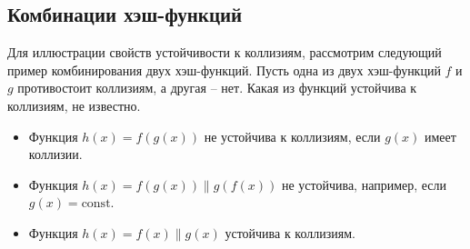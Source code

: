 \subsection{Комбинации хэш-функций}

Для иллюстрации свойств устойчивости к коллизиям, рассмотрим следующий пример комбинирования двух хэш-функций. Пусть одна из двух хэш-функций $f$ и $g$ противостоит коллизиям, а другая -- нет. Какая из функций устойчива к коллизиям, не известно.
\begin{itemize}
    \item Функция $h(x) = f(g(x))$ не устойчива к коллизиям, если $g(x)$ имеет коллизии.
    \item Функция $h(x) = f(g(x)) \| g(f(x))$ не устойчива, например, если $g(x) = \textrm{const}$.
    \item Функция $h(x) = f(x) \| g(x)$ устойчива к коллизиям.
\end{itemize}
